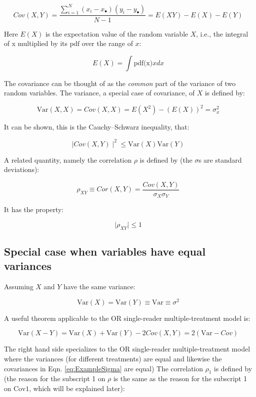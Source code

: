 \documentclass[
]{book}
\begin{document}
\begin{equation}
Cov(X,Y) =\frac{\sum_{i=1}^{N}(x_{i}-x_{\bullet})(y_{i}-y_{\bullet})}{N-1}=E(XY)-E(X)-E(Y)
\label{eq:DefCov}
\end{equation}

Here \(E(X)\) is the expectation value of the random variable \(X\), i.e., the integral of x multiplied by its \(\text{pdf}\) over the range of \(x\):

\[E(X)=\int \text{pdf(x)} x dx\]

The covariance can be thought of as the \emph{common} part of the variance of two random variables. The variance, a special case of covariance, of \(X\) is defined by:

\[\text{Var}(X,X) = Cov(X,X)=E(X^2)-(E(X))^2=\sigma_x^2\]

It can be shown, this is the Cauchy--Schwarz inequality, that:

\[\mid Cov(X,Y) \mid^2 \le \text{Var}(X)\text{Var}(Y)\]

A related quantity, namely the correlation \(\rho\) is defined by (the \(\sigma\)s are standard deviations):

\[\rho_{XY} \equiv Cor(X,Y)=\frac{Cov(X,Y)}{\sigma_X \sigma_Y}\]

It has the property:

\[\mid \rho_{XY} \mid \le 1\]

\hypertarget{special-case-when-variables-have-equal-variances}{%
\subsection{Special case when variables have equal variances}\label{special-case-when-variables-have-equal-variances}}

Assuming \(X\) and \(Y\) have the same variance:

\[\text{Var}(X)=\text{Var}(Y)\equiv \text{Var}\equiv \sigma^2\]

A useful theorem applicable to the OR single-reader multiple-treatment model is:

\begin{equation}
\text{Var}(X-Y)=\text{Var}(X)+\text{Var}(Y)-2Cov(X,Y)=2(\text{Var}-Cov)
\label{eq:UsefulTheorem}
\end{equation}

The right hand side specializes to the OR single-reader multiple-treatment model where the variances (for different treatments) are equal and likewise the covariances in Eqn. \eqref{eq:ExampleSigma} are equal) The correlation \(\rho_1\) is defined by (the reason for the subscript 1 on \(\rho\) is the same as the reason for the subscript 1 on \(\text{Cov1}\), which will be explained later):
\end{document}
